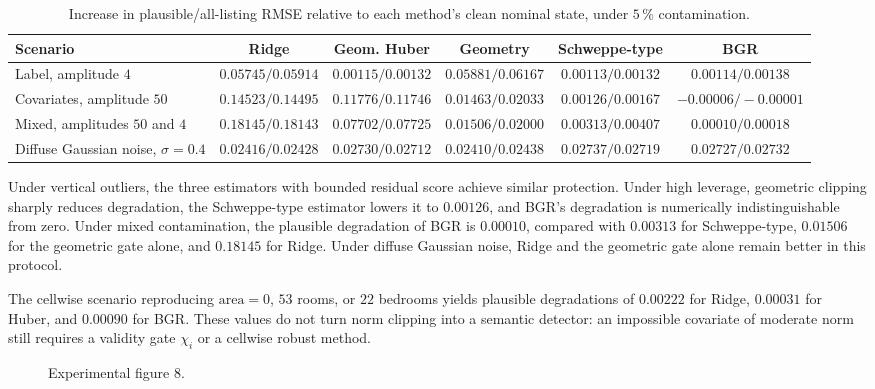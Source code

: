 \begin{table}[H]
\centering
\caption{Increase in plausible/all-listing RMSE relative to each method's clean nominal state, under $5\,\%$ contamination.}
\label{tab:seloger-ablation}
\scriptsize
\setlength{\tabcolsep}{4.5pt}
\begin{tabular}{@{}lccccc@{}}
\toprule
Scenario & Ridge & Geom. Huber & Geometry & Schweppe-type & BGR \\
\midrule
Label, amplitude $4$
& $0.05745/0.05914$
& $0.00115/0.00132$
& $0.05881/0.06167$
& $\mathbf{0.00113}/0.00132$
& $0.00114/0.00138$ \\
Covariates, amplitude $50$
& $0.14523/0.14495$
& $0.11776/0.11746$
& $0.01463/0.02033$
& $0.00126/0.00167$
& $\mathbf{-0.00006/-0.00001}$ \\
Mixed, amplitudes $50$ and $4$
& $0.18145/0.18143$
& $0.07702/0.07725$
& $0.01506/0.02000$
& $0.00313/0.00407$
& $\mathbf{0.00010/0.00018}$ \\
Diffuse Gaussian noise, $\sigma=0.4$
& $\mathbf{0.02416}/0.02428$
& $0.02730/0.02712$
& $0.02410/0.02438$
& $0.02737/0.02719$
& $0.02727/0.02732$ \\
\bottomrule
\end{tabular}
\end{table}

Under vertical outliers, the three estimators with bounded residual score achieve similar protection. Under high leverage, geometric clipping sharply reduces degradation, the Schweppe-type estimator lowers it to $0.00126$, and BGR's degradation is numerically indistinguishable from zero. Under mixed contamination, the plausible degradation of BGR is $0.00010$, compared with $0.00313$ for Schweppe-type, $0.01506$ for the geometric gate alone, and $0.18145$ for Ridge. Under diffuse Gaussian noise, Ridge and the geometric gate alone remain better in this protocol.

The cellwise scenario reproducing $\mathrm{area}=0$, $53$ rooms, or $22$ bedrooms yields plausible degradations of $0.00222$ for Ridge, $0.00031$ for Huber, and $0.00090$ for BGR. These values do not turn norm clipping into a semantic detector: an impossible covariate of moderate norm still requires a validity gate $\chi_i$ or a cellwise robust method.

\begin{figure}[htbp]
\centering{}
\caption{Experimental figure 8.}\label{fig:seloger-bgr}
\end{figure}

